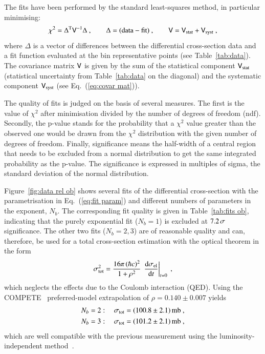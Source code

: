 The fits have been performed by the standard least-squares method, in particular minimising:
\begin{equation}
\label{eq:chi sq}
	\chi^2 = \Delta^{\rm T} \mathsf{V}^{-1} \Delta\ ,\qquad
	\Delta = (\hbox{data} - \hbox{fit})\ ,\qquad
	\mathsf{V} = \mathsf{V}_{\rm stat} + \mathsf{V}_{\rm syst}\ ,
\end{equation}
where $\Delta$ is a vector of differences between the differential cross-section data and a fit function evaluated at the bin representative points (see Table~\ref{tab:data}). The covariance matrix $\mathsf{V}$ is given by the sum of the statistical component $\mathsf{V}_{\rm stat}$ (statistical uncertainty from Table~\ref{tab:data} on the diagonal) and the systematic component $\mathsf{V}_{\rm syst}$ (see Eq.~(\ref{eq:covar mat})).

The quality of fits is judged on the basis of several measures. The first is the value of $\chi^2$ after minimisation divided by the number of degrees of freedom (ndf). Secondly, the p-value stands for the probability that a $\chi^2$ value greater than the observed one would be drawn from the $\chi^2$ distribution with the given number of degrees of freedom. Finally, significance means the half-width of a central region that needs to be excluded from a normal distribution to get the same integrated probability as the p-value. The significance is expressed in multiples of sigma, the standard deviation of the normal distribution.

Figure~\ref{fig:data rel ob} shows several fits of the differential cross-section with the parametrisation in Eq.~(\ref{eq:fit param}) and different numbers of parameters in the exponent, $N_b$. The corresponding fit quality is given in Table~\ref{tab:fits ob}, indicating that the purely exponential fit ($N_b = 1$) is excluded at $7.2\,{\rm \sigma}$ significance.
%
The other two fits ($N_b = 2, 3$) are of reasonable quality and can, therefore, be used for a total cross-section estimation with the optical theorem in the form
\begin{equation}
\label{eq:si tot}
\sigma_{\rm tot}^2 = {16\pi\, (\hbar c)^2\over 1 + \rho^2}\, \left. {\rm d}\sigma_{\rm el}\over{\rm d} t\right|_{t=0}\ ,
\end{equation}
which neglects the effects due to the Coulomb interaction (QED).
Using the COMPETE~\cite{compete} preferred-model extrapolation of $\rho = 0.140\pm 0.007$ yields
\begin{equation}
\label{eq:si tot results}
	\begin{aligned}
		N_b &= 2:\quad \sigma_{\rm tot} = (100.8 \pm 2.1)\un{mb}\ ,\\	%
		N_b &= 3:\quad \sigma_{\rm tot} = (101.2 \pm 2.1)\un{mb}\ ,\\	%
	\end{aligned}
\end{equation}
which are well compatible with the previous measurement using the luminosity-independent \linebreak method~\cite{prl111}.

